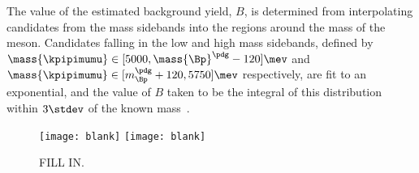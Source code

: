 
The value of the estimated background yield, $B$, is determined from interpolating
\btokpipimumu candidates from the mass sidebands into the regions around the mass of the \Bp meson.
Candidates falling in the low and high mass sidebands,
defined by
$\mass{\kpipimumu}\in[5000,\mass{\Bp}^\pdg-120]\mev$
and
$\mass{\kpipimumu}\in[m_{\Bp}^\pdg+120,5750]\mev$
respectively,
are fit to an exponential, and the value of $B$ taken to be the integral of this
distribution within $3\stdev$ of the known \Bp mass~\cite{PDG2012}.


\begin{figure}
  \begin{center}
    \texttt{[image: blank]}
    \texttt{[image: blank]}
    \caption{
      FILL IN.
    }
    \label{fig:kpipi:opt}
  \end{center}
\end{figure}



